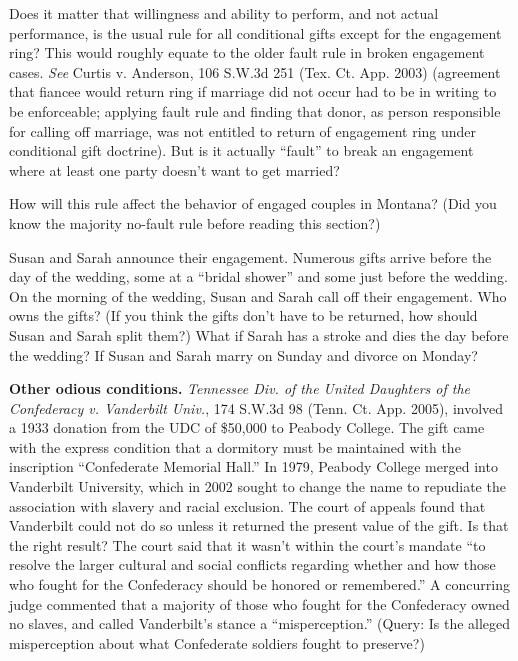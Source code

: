 Does it matter that willingness and ability to perform, and not actual
performance, is the usual rule for all conditional gifts except for the
engagement ring?  This would roughly equate to the older fault rule in broken
engagement cases.  \textit{See} Curtis v. Anderson, 106 S.W.3d 251 (Tex. Ct.
App. 2003) (agreement that fiancee would return ring if marriage did not occur
had to be in writing to be enforceable; applying fault rule and finding that
donor, as person responsible for calling off marriage, was not entitled to
return of engagement ring under conditional gift doctrine).  But is it actually
``fault'' to break an engagement where at least one party doesn't want to get
married?  


\item How will this rule affect the behavior of engaged couples in Montana? 
(Did you know the majority no-fault rule before reading this section?)


\item Susan and Sarah announce their engagement.  Numerous gifts arrive before
the day of the wedding, some at a ``bridal shower'' and some just before the
wedding.  On the morning of the wedding, Susan and Sarah call off their
engagement. Who owns the gifts?  (If you think the gifts don't have to be
returned, how should Susan and Sarah split them?) What if Sarah has a stroke
and dies the day before the wedding? If Susan and Sarah marry on Sunday and
divorce on Monday?


\item \textbf{Other odious conditions.} \emph{Tennessee Div. of the United
Daughters
of the Confederacy v. Vanderbilt Univ.}, 174 S.W.3d 98 (Tenn. Ct. App. 2005),
involved a 1933 donation from the UDC of \$50,000 to Peabody College. The gift
came with the express condition that a dormitory must be maintained with the
inscription ``Confederate Memorial Hall.'' In 1979, Peabody College merged into
Vanderbilt University, which in 2002 sought to change the name to repudiate the
association with slavery and racial exclusion.  The court of appeals found that
Vanderbilt could not do so unless it returned the present value of the gift. 
Is that the right result?  The court said that it wasn't within the court's
mandate ``to resolve the larger cultural and social conflicts regarding whether
and how those who fought for the Confederacy should be honored or remembered.''
 A concurring judge commented that a majority of those who fought for the
Confederacy owned no slaves, and called Vanderbilt's stance a
``misperception.''  (Query: Is the alleged misperception about what Confederate
soldiers fought to preserve?)


